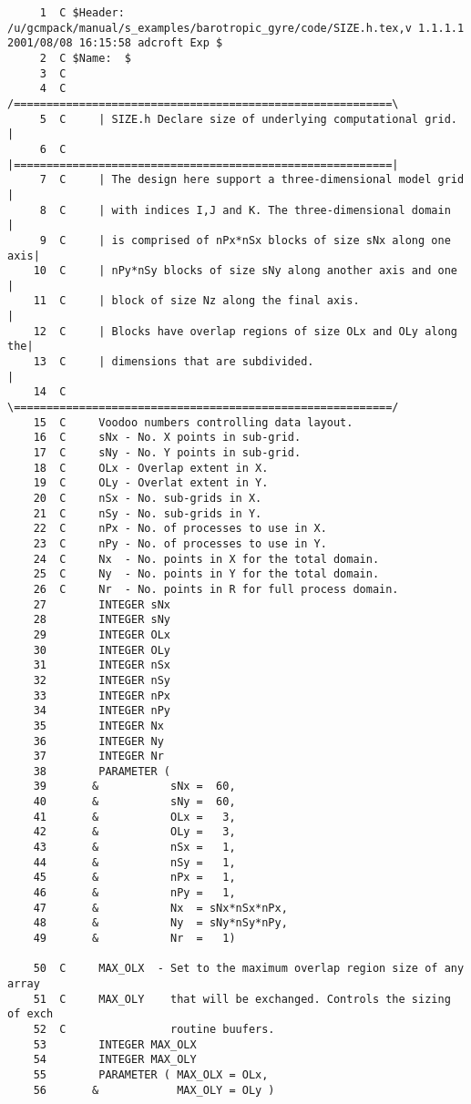 
\begin{verbatim}
     1	C $Header: /u/gcmpack/manual/s_examples/barotropic_gyre/code/SIZE.h.tex,v 1.1.1.1 2001/08/08 16:15:58 adcroft Exp $
     2	C $Name:  $
     3	C
     4	C     /==========================================================\
     5	C     | SIZE.h Declare size of underlying computational grid.    |
     6	C     |==========================================================|
     7	C     | The design here support a three-dimensional model grid   |
     8	C     | with indices I,J and K. The three-dimensional domain     |
     9	C     | is comprised of nPx*nSx blocks of size sNx along one axis|
    10	C     | nPy*nSy blocks of size sNy along another axis and one    |
    11	C     | block of size Nz along the final axis.                   |
    12	C     | Blocks have overlap regions of size OLx and OLy along the|
    13	C     | dimensions that are subdivided.                          |
    14	C     \==========================================================/
    15	C     Voodoo numbers controlling data layout.
    16	C     sNx - No. X points in sub-grid.
    17	C     sNy - No. Y points in sub-grid.
    18	C     OLx - Overlap extent in X.
    19	C     OLy - Overlat extent in Y.
    20	C     nSx - No. sub-grids in X.
    21	C     nSy - No. sub-grids in Y.
    22	C     nPx - No. of processes to use in X.
    23	C     nPy - No. of processes to use in Y.
    24	C     Nx  - No. points in X for the total domain.
    25	C     Ny  - No. points in Y for the total domain.
    26	C     Nr  - No. points in R for full process domain.
    27	      INTEGER sNx
    28	      INTEGER sNy
    29	      INTEGER OLx
    30	      INTEGER OLy
    31	      INTEGER nSx
    32	      INTEGER nSy
    33	      INTEGER nPx
    34	      INTEGER nPy
    35	      INTEGER Nx
    36	      INTEGER Ny
    37	      INTEGER Nr
    38	      PARAMETER (
    39	     &           sNx =  60,
    40	     &           sNy =  60,
    41	     &           OLx =   3,
    42	     &           OLy =   3,
    43	     &           nSx =   1,
    44	     &           nSy =   1,
    45	     &           nPx =   1,
    46	     &           nPy =   1,
    47	     &           Nx  = sNx*nSx*nPx,
    48	     &           Ny  = sNy*nSy*nPy,
    49	     &           Nr  =   1)
       
    50	C     MAX_OLX  - Set to the maximum overlap region size of any array
    51	C     MAX_OLY    that will be exchanged. Controls the sizing of exch
    52	C                routine buufers.
    53	      INTEGER MAX_OLX
    54	      INTEGER MAX_OLY
    55	      PARAMETER ( MAX_OLX = OLx,
    56	     &            MAX_OLY = OLy )
\end{verbatim}
